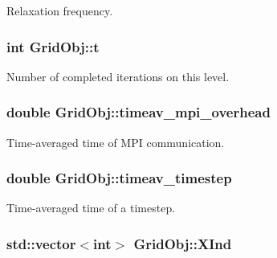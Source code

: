 Relaxation frequency. 

\subsubsection[{\texorpdfstring{t}{t}}]{\setlength{\rightskip}{0pt plus 5cm}int Grid\+Obj\+::t}\hypertarget{class_grid_obj_a783b18a053e244ae7b7b436ab21c0592}{}\label{class_grid_obj_a783b18a053e244ae7b7b436ab21c0592}


Number of completed iterations on this level. 

\subsubsection[{\texorpdfstring{timeav\+\_\+mpi\+\_\+overhead}{timeav_mpi_overhead}}]{\setlength{\rightskip}{0pt plus 5cm}double Grid\+Obj\+::timeav\+\_\+mpi\+\_\+overhead}\hypertarget{class_grid_obj_a147cfb80b653ca4432432e8185cf38ef}{}\label{class_grid_obj_a147cfb80b653ca4432432e8185cf38ef}


Time-\/averaged time of M\+PI communication. 

\subsubsection[{\texorpdfstring{timeav\+\_\+timestep}{timeav_timestep}}]{\setlength{\rightskip}{0pt plus 5cm}double Grid\+Obj\+::timeav\+\_\+timestep}\hypertarget{class_grid_obj_a2ad670e6b9bdd28b5060397800170310}{}\label{class_grid_obj_a2ad670e6b9bdd28b5060397800170310}


Time-\/averaged time of a timestep. 

\subsubsection[{\texorpdfstring{X\+Ind}{XInd}}]{\setlength{\rightskip}{0pt plus 5cm}std\+::vector$<$int$>$ Grid\+Obj\+::\+X\+Ind}\hypertarget{class_grid_obj_ad9bb2153aec972c499ce969a76d908fd}{}\label{class_grid_obj_ad9bb2153aec972c499ce969a76d908fd}


